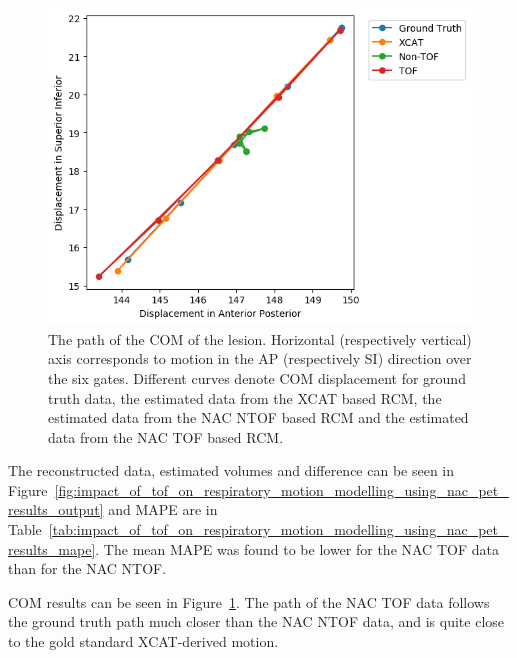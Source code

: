             \begin{figure}
                \centering
                
                \includegraphics[width=1.0\linewidth]{figures/TOF.png}
                
                \captionsetup{singlelinecheck=false, justification=raggedright}
                \caption{The path of the \gls{COM} of the lesion. Horizontal (respectively vertical) axis corresponds to motion in the \gls{AP} (respectively \gls{SI}) direction over the six gates. Different curves denote \gls{COM} displacement for  ground truth data, the estimated data from the \gls{XCAT} based \gls{RCM}, the estimated data from the \gls{NAC} \gls{NTOF} based \gls{RCM} and the estimated data from the \gls{NAC} \gls{TOF} based \gls{RCM}.} \label{fig:impact_of_tof_on_respiratory_motion_modelling_using_nac_pet_results_com_graph}
            \end{figure}
            
             The reconstructed data, estimated volumes and difference can be seen in Figure~\ref{fig:impact_of_tof_on_respiratory_motion_modelling_using_nac_pet_results_output} and \gls{MAPE} are in Table~\ref{tab:impact_of_tof_on_respiratory_motion_modelling_using_nac_pet_results_mape}. The mean \gls{MAPE} was found to be lower for the \gls{NAC} \gls{TOF} data than for the \gls{NAC} \gls{NTOF}.
            
             \gls{COM} results can be seen in Figure~\ref{fig:impact_of_tof_on_respiratory_motion_modelling_using_nac_pet_results_com_graph}. The path of the \gls{NAC} \gls{TOF} data follows the ground truth path much closer than the \gls{NAC} \gls{NTOF} data, and is quite close to the gold standard \gls{XCAT}-derived motion.
            
